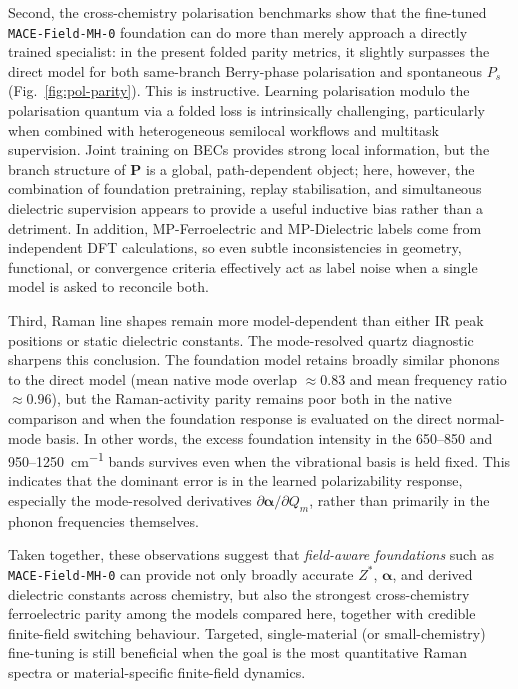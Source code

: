 \documentclass[aps,physrev,graphicx,amsmath,amssymb,
               reprint,superscriptaddress]{revtex4-2}
\begin{document}
Second, the cross-chemistry polarisation benchmarks show that the fine-tuned \texttt{MACE-Field-MH-0} foundation can do more than merely approach a directly trained specialist: in the present folded parity metrics, it slightly surpasses the direct model for both same-branch Berry-phase polarisation and spontaneous $P_s$ (Fig.~\ref{fig:pol-parity}). This is instructive. Learning polarisation modulo the polarisation quantum via a folded loss is intrinsically challenging, particularly when combined with heterogeneous semilocal workflows and multitask supervision. Joint training
on BECs provides strong local information, but the branch structure of $\mathbf P$ is a global, path-dependent object; here, however, the combination of foundation pretraining, replay stabilisation, and simultaneous dielectric supervision appears to provide a useful inductive bias rather than a detriment. In addition, MP-Ferroelectric and
MP-Dielectric labels come from independent DFT calculations, so even subtle inconsistencies in geometry, functional, or convergence criteria effectively act as label noise when a single model is asked to reconcile
both.

Third, Raman line shapes remain more model-dependent than either IR peak positions or static dielectric constants. The mode-resolved quartz diagnostic sharpens this conclusion. The foundation model retains broadly similar phonons to the direct model (mean native mode overlap $\approx 0.83$ and mean frequency ratio $\approx 0.96$), but the Raman-activity parity remains poor both in the native comparison and when the foundation response is evaluated on the direct normal-mode basis. In other words, the excess foundation intensity in the 650--850 and 950--1250~\si{cm^{-1}} bands survives even when the vibrational basis is held fixed. This indicates that the dominant error is in the learned polarizability response, especially the mode-resolved derivatives $\partial\boldsymbol\alpha/\partial Q_m$, rather than primarily in the phonon frequencies themselves.

Taken together, these observations suggest that \emph{field-aware foundations} such as \texttt{MACE-Field-MH-0} can provide not only broadly accurate $Z^*$, $\boldsymbol\alpha$, and derived dielectric constants across chemistry, but also the strongest cross-chemistry ferroelectric parity among the models compared here, together with credible finite-field switching behaviour. Targeted, single-material (or small-chemistry) fine-tuning is still beneficial when the goal is the most quantitative Raman spectra or material-specific finite-field dynamics.
\\
\end{document}
